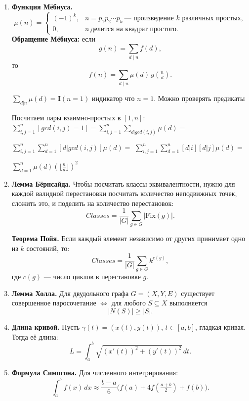 \begin{enumerate}
    \item \textbf{Функция Мёбиуса.}  
    \[
        \mu(n) =
        \begin{cases}
            (-1)^k, & n = p_1 p_2 \cdots p_k \ \text{--- произведение $k$ различных простых}, \\
            0, & n \ \text{делится на квадрат простого}.
        \end{cases}
    \]  
    \textbf{Обращение Мёбиуса:} если 
    \[
        g(n) = \sum_{d \mid n} f(d),
    \]
    то
    \[
        f(n) = \sum_{d \mid n} \mu(d)\, g\!\left(\tfrac{n}{d}\right).
    \]

    $\sum_{d|n} \mu(d) = \mathbf{I}(n = 1)$ индикатор что $n=1$. Можно проверять предикаты

    Посчитаем пары взаимно-простых в $[1, n]$: $\sum_{i,j=1}^{n}[gcd(i, j)=1] = \sum_{i,j=1}^{n}\sum_{d|gcd(i, j)}\mu(d)=$ 
    
    $\sum_{i,j=1}^{n}\sum_{d=1}^{n}[d|gcd(i, j)]\mu(d) =$
    $ \sum_{i,j=1}^{n}\sum_{d=1}^{n} [d|i][d|j]\mu(d) =$ 
    
    $\sum_{d=1}^{n}\mu(d) (\lfloor \frac{n}{d} \rfloor)^2$

    \item \textbf{Лемма Бёрнсайда.} Чтобы посчитать классы эквивалентности, нужно для каждой валидной перестановки посчитать количество неподвижных точек, сложить это, и поделить на количество перестановок:
    \[
        Classes = \frac{1}{|G|} \sum_{g \in G} | \mathrm{Fix}(g) |.
    \]  

    \textbf{Теорема Пойя.} Если каждый элемент независимо от других принимает одно из $k$ состояний, то:
    \[
        Classes= \frac{1}{|G|} \sum_{g \in G} k^{c(g)},
    \]
    где $c(g)$ --- число циклов в перестановке $g$.

    \item \textbf{Лемма Холла.} Для двудольного графа $G=(X,Y,E)$ существует совершенное паросочетание $\Leftrightarrow$ для любого $S \subseteq X$ выполняется
    \[
        |N(S)| \geq |S|.
    \]

    \item \textbf{Длина кривой.} Пусть $\gamma(t) = (x(t), y(t))$, $t \in [a,b]$, гладкая кривая. Тогда её длина:
    \[
        L = \int_a^b \sqrt{ (x'(t))^2 + (y'(t))^2 } \, dt.
    \]

    \item \textbf{Формула Симпсона.} Для численного интегрирования:
    \[
        \int_a^b f(x)\, dx \approx \frac{b-a}{6}\Big( f(a) + 4 f\!\left(\tfrac{a+b}{2}\right) + f(b) \Big).
    \]


\end{enumerate}
